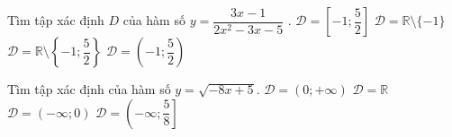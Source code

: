 \begin{ex}%
	Tìm  tập xác định $D$ của hàm số $y=\dfrac{3x-1}{2x^2-3x-5}$ .
	 \choice
		 {$\mathscr{D}=\left[-1;\dfrac{5}{2}\right]$}
		{$\mathscr{D}=\mathbb{R} \setminus \{-1\}$} 
		{\True $\mathscr{D}=\mathbb{R}  \setminus \left\{-1;\dfrac{5}{2}\right\}$}
		 {$\mathscr{D}=\left(-1;\dfrac{5}{2}\right)$}
\end{ex}

\begin{ex}%
	Tìm tập xác định  của hàm số $y=\sqrt{-8x+5}$.
	\choice 
		{$\mathscr{D}=(0;  +\infty)$}
		 {$\mathscr{D}=\mathbb{R}$}
		{$\mathscr{D}=(-\infty;0)$} 
		 {\True $\mathscr{D}=\left(-\infty;\dfrac{5}{8}\right]$}
	 \loigiai{
		Hàm  số $y=\sqrt{-8x+5}$ xác định khi $-8x+5\ge 0\Leftrightarrow x\le \dfrac{5}{8}$.\\ Vậy $\mathscr{D}=\left(-\infty;\dfrac{5}{8}\right].$
	 }
\end{ex}

